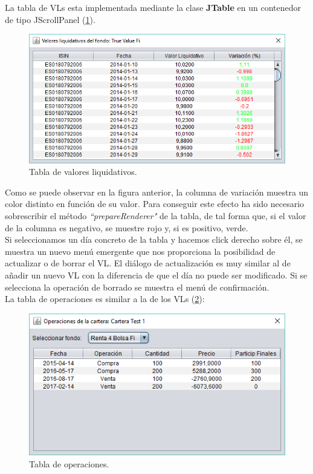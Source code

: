 \documentclass[12pt, a4paper]{book}
\begin{document}
\newpage

La tabla de \gls{VL}s esta implementada mediante la clase \textbf{JTable} en un contenedor de tipo JScrollPanel (\ref{fig:vls}).

	\begin{figure}[htbp]
	\centering
	\includegraphics[width=12cm]{figuras/vls.PNG}
	\caption{Tabla de valores liquidativos.}
	\label{fig:vls}
	\end {figure}
	\vspace{1cm}
	
Como se puede observar en la figura anterior, la columna de variación muestra un color distinto en función de su valor. Para conseguir este efecto ha sido necesario sobrescribir el método \textit{``prepareRenderer"} de la tabla, de tal forma que, si el valor de la columna es negativo, se muestre rojo y, si es positivo, verde.\\

Si seleccionamos un día concreto de la tabla y hacemos click derecho sobre él, se muestra un nuevo menú emergente que nos proporciona la posibilidad de actualizar o de borrar el \gls{VL}. El diálogo de actualización es muy similar al de añadir un nuevo \gls{VL} con la diferencia de que el día no puede ser modificado. Si se selecciona la operación de borrado se muestra el menú de confirmación. 
\\
\newpage
La tabla de operaciones es similar a la de los \gls{VL}s (\ref{fig:ops}):

	\begin{figure}[htbp]
	\centering
	\includegraphics[width=12cm]{figuras/ops.PNG}
	\caption{Tabla de operaciones.}
	\label{fig:ops}
	\end {figure}
\end{document}
